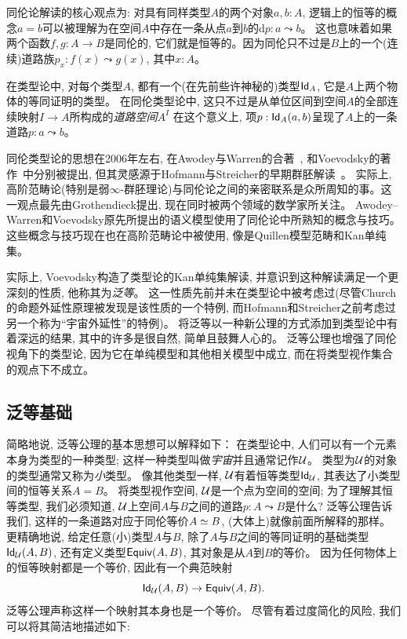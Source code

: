 同伦论解读的核心观点为: 对具有同样类型$A$的两个对象$a, b:A$,  逻辑上的恒等的概念$a=b$可以被理解为在空间$A$中存在一条从点$a$到$b$的d$p : a \leadsto b$。
这也意味着如果两个函数$f, g: A \to B$是同伦的, 它们就是恒等的。因为同伦只不过是$B$上的一个(连续)道路族$p_x: f(x) \leadsto g(x)$, 其中$x:A$。

在类型论中, 对每个类型$A$, 都有一个(在先前些许神秘的)类型$\idtypevar{A}$, 它是$A$上两个物体的等同证明的类型。
在同伦类型论中, 这只不过是从单位区间到空间$A$的全部连续映射$I \to A$所构成的\emph{道路空间}$A^I$
%
%
%
%
在这个意义上, 项$p : \idtype[A]{a}{b}$呈现了$A$上的一条道路$p : a \leadsto b$。

同伦类型论的思想在2006年左右, 在Awodey与Warren的合著~\cite{AW}, 和Voevodsky的著作~\cite{VV}中分别被提出,  
但其灵感源于Hofmann与Streicher的早期群胚解读~\cite{hs:gpd-typethy}。
实际上, 高阶范畴论(特别是弱$\infty$-群胚理论)与同伦论之间的亲密联系是众所周知的事。这一观点最先由Grothendieck提出, 现在同时被两个领域的数学家所关注。
Awodey--Warren和Voevodsky原先所提出的语义模型使用了同伦论中所熟知的概念与技巧。这些概念与技巧现在也在高阶范畴论中被使用, 
像是Quillen模型范畴和Kan单纯集。
%
%

实际上, Voevodsky构造了类型论的Kan单纯集解读, 并意识到这种解读满足一个更深刻的性质, 他称其为\emph{泛等}。
这一性质先前并未在类型论中被考虑过(尽管Church的命题外延性原理被发现是该性质的一个特例, 而Hofmann和Streicher之前考虑过另一个称为``宇宙外延性''的特例)。
将泛等以一种新公理的方式添加到类型论中有着深远的结果, 其中的许多是很自然, 简单且鼓舞人心的。
泛等公理也增强了同伦视角下的类型论, 因为它在单纯模型和其他相关模型中成立, 而在将类型视作集合的观点下不成立。

\subsection*{泛等基础}

简略地说, 泛等公理的基本思想可以解释如下：
在类型论中, 人们可以有一个元素本身为类型的一种类型; 这样一种类型叫做\emph{宇宙}并且通常记作$\UU$。
类型为$\UU$的对象的类型通常又称为\emph{小}类型。
%
%
像其他类型一样, $\UU$有着恒等类型$\idtypevar{\UU}$, 其表达了小类型间的恒等关系$A=B$。
将类型视作空间, $\UU$是一个点为空间的空间; 为了理解其恒等类型, 我们必须知道, $\UU$上空间$A$与$B$之间的道路$p: A \leadsto B$是什么?
泛等公理告诉我们, 这样的一条道路对应于同伦等价$\eqv A B$,  (大体上)就像前面所解释的那样。
更精确地说, 给定任意(小)类型$A$与$B$, 除了$A$与$B$之间的等同证明的基础类型$\idtype[\UU]AB$, 还有定义类型$\texteqv AB$, 其对象是从$A$到$B$的等价。
因为任何物体上的恒等映射都是一个等价, 因此有一个典范映射
\[\idtype[\UU]AB\to\texteqv AB.\]
泛等公理声称这样一个映射其本身也是一个等价。
尽管有着过度简化的风险, 我们可以将其简洁地描述如下:

